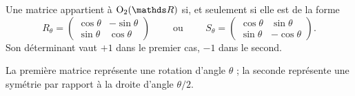 \begin{thm}
	Une matrice appartient à $\mathrm{O}_2(\R)$\/ si, et seulement si elle est de la forme \[
		R_\theta = \begin{pmatrix}
			\cos \theta & -\sin \theta\\
			\sin \theta & \cos \theta
		\end{pmatrix} \quad\quad\text{ ou }\quad\quad S_\theta = \begin{pmatrix}
			\cos \theta & \sin \theta\\
			\sin \theta & -\cos \theta
		\end{pmatrix}
	.\]
	Son déterminant vaut $+1$\/ dans le premier cas, $-1$\/ dans le second.
\end{thm}

La première matrice représente une rotation d'angle $\theta$\/ ; la seconde représente une symétrie par rapport à la droite d'angle $\theta / 2$.


